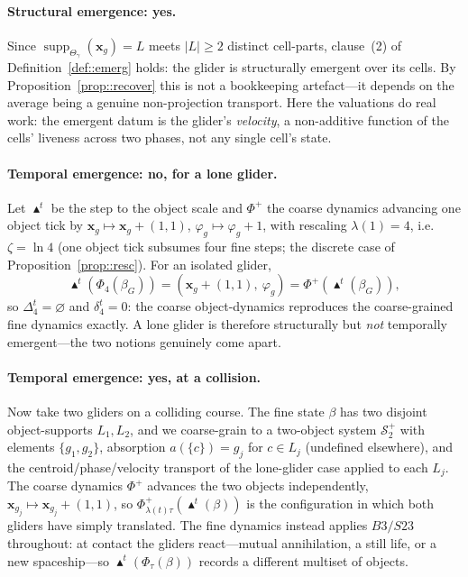 \documentclass[runningheads]{llncs}
\newcommand{\supp}{\operatorname{supp}}
\begin{document}
\paragraph{Structural emergence: yes.} Since $\supp_{\Theta_\gamma}(\mathbf x_g)=L$ meets $|L|\geq2$ distinct cell-parts, clause~(2) of Definition~\ref{def::emerg} holds: the glider is structurally emergent over its cells. By Proposition~\ref{prop::recover} this is not a bookkeeping artefact---it depends on the average being a genuine non-projection transport. Here the valuations do real work: the emergent datum is the glider's \emph{velocity}, a non-additive function of the cells' liveness across two phases, not any single cell's state.

\paragraph{Temporal emergence: no, for a lone glider.} Let $\blacktriangle^t$ be the step to the object scale and $\Phi^{+}$ the coarse dynamics advancing one object tick by $\mathbf x_g\mapsto\mathbf x_g+(1,1)$, $\varphi_g\mapsto\varphi_g+1$, with rescaling $\lambda(1)=4$, i.e.\ $\zeta=\ln 4$ (one object tick subsumes four fine steps; the discrete case of Proposition~\ref{prop::resc}). For an isolated glider,
\[
\blacktriangle^t\!\left(\Phi_4(\beta_G)\right)=(\mathbf x_g+(1,1),\ \varphi_g)=\Phi^{+}\!\left(\blacktriangle^t(\beta_G)\right),
\]
so $\Delta^t_4=\varnothing$ and $\delta^t_4=0$: the coarse object-dynamics reproduces the coarse-grained fine dynamics exactly. A lone glider is therefore structurally but \emph{not} temporally emergent---the two notions genuinely come apart.

\paragraph{Temporal emergence: yes, at a collision.} Now take two gliders on a colliding course. The fine state $\beta$ has two disjoint object-supports $L_1,L_2$, and we coarse-grain to a two-object system $\mathcal S^{+}_2$ with elements $\{g_1,g_2\}$, absorption $a(\{c\})=g_j$ for $c\in L_j$ (undefined elsewhere), and the centroid/phase/velocity transport of the lone-glider case applied to each $L_j$. The coarse dynamics $\Phi^{+}$ advances the two objects independently, $\mathbf x_{g_j}\mapsto\mathbf x_{g_j}+(1,1)$, so $\Phi^{+}_{\lambda(t)\tau}(\blacktriangle^t(\beta))$ is the configuration in which both gliders have simply translated. The fine dynamics instead applies $B3/S23$ throughout: at contact the gliders react---mutual annihilation, a still life, or a new spaceship---so $\blacktriangle^t(\Phi_\tau(\beta))$ records a different multiset of objects.
\end{document}
